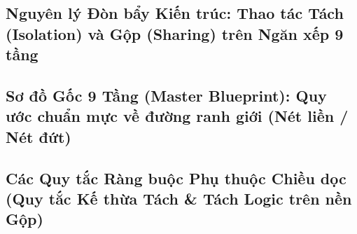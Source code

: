 \par{}
\subsection{Nguyên lý Đòn bẩy Kiến trúc: Thao tác Tách (Isolation) và Gộp (Sharing) trên Ngăn xếp 9 tầng}
\label{outline:2:boundaries:8}

\par{}
\subsection{Sơ đồ Gốc 9 Tầng (Master Blueprint): Quy ước chuẩn mực về đường ranh giới (Nét liền / Nét đứt)}
\label{outline:2:boundaries:9}

\par{}
\subsection{Các Quy tắc Ràng buộc Phụ thuộc Chiều dọc (Quy tắc Kế thừa Tách \& Tách Logic trên nền Gộp)}
\label{outline:2:boundaries:10}
